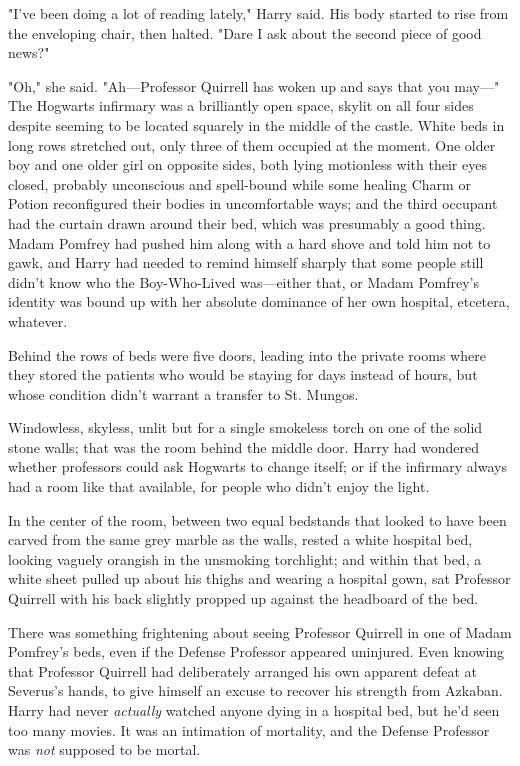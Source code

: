 "I've been doing a lot of reading lately," Harry said. His body started to rise
from the enveloping chair, then halted. "Dare I ask about the second piece of
good news?"

"Oh," she said. "Ah---Professor Quirrell has woken up and says that you may\mbox{---}"
\sbreak
The Hogwarts infirmary was a brilliantly open space, skylit on all four sides
despite seeming to be located squarely in the middle of the castle. White beds
in long rows stretched out, only three of them occupied at the moment. One
older boy and one older girl on opposite sides, both lying motionless with
their eyes closed, probably unconscious and spell-bound while some healing
Charm or Potion reconfigured their bodies in uncomfortable ways; and the third
occupant had the curtain drawn around their bed, which was presumably a good
thing. Madam Pomfrey had pushed him along with a hard shove and told him not to
gawk, and Harry had needed to remind himself sharply that some people still
didn't know who the Boy-Who-Lived was---either that, or Madam Pomfrey's
identity was bound up with her absolute dominance of her own hospital,
etcetera, whatever.

Behind the rows of beds were five doors, leading into the private rooms where
they stored the patients who would be staying for days instead of hours, but
whose condition didn't warrant a transfer to St. Mungos.

Windowless, skyless, unlit but for a single smokeless torch on one of the solid
stone walls; that was the room behind the middle door. Harry had wondered
whether professors could ask Hogwarts to change itself; or if the infirmary
always had a room like that available, for people who didn't enjoy the light.

In the center of the room, between two equal bedstands that looked to have been
carved from the same grey marble as the walls, rested a white hospital bed,
looking vaguely orangish in the unsmoking torchlight; and within that bed, a
white sheet pulled up about his thighs and wearing a hospital gown, sat
Professor Quirrell with his back slightly propped up against the headboard of
the bed.

There was something frightening about seeing Professor Quirrell in one of Madam
Pomfrey's beds, even if the Defense Professor appeared uninjured. Even knowing
that Professor Quirrell had deliberately arranged his own apparent defeat at
Severus's hands, to give himself an excuse to recover his strength from
Azkaban. Harry had never \emph{actually} watched anyone dying in a hospital
bed, but he'd seen too many movies. It was an intimation of mortality, and the
Defense Professor was \emph{not} supposed to be mortal.

